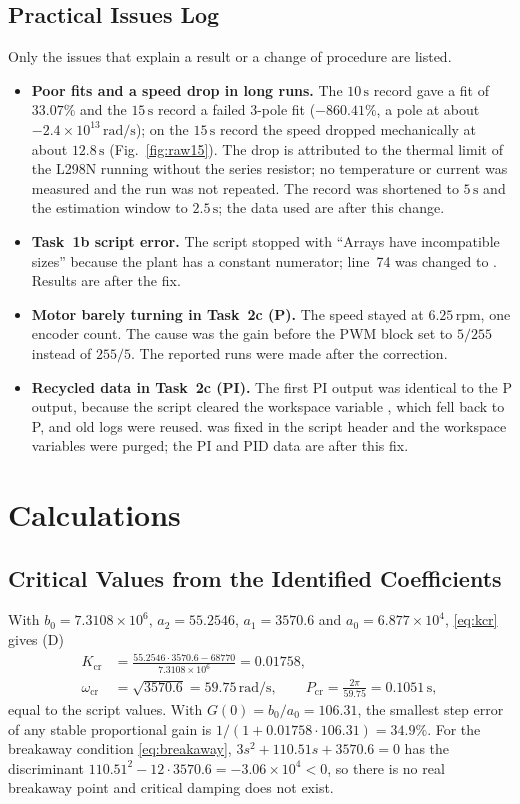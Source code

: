 \documentclass[lettersize,journal]{IEEEtran}
\newcommand{\code}[1]{\texttt{\detokenize{#1}}}
\newcommand{\Kcr}{K_{\mathrm{cr}}}
\newcommand{\wcr}{\omega_{\mathrm{cr}}}
\newcommand{\Pcr}{P_{\mathrm{cr}}}
\newcommand{\rpm}{\,\text{rpm}}
\begin{document}
\subsection{Practical Issues Log}
\label{sec:issues}
Only the issues that explain a result or a change of procedure are listed.
\begin{itemize}
\item \textbf{Poor fits and a speed drop in long runs.} The $10\,\text{s}$ record gave a fit of $33.07\%$ and the $15\,\text{s}$ record a failed $3$-pole fit ($-860.41\%$, a pole at about $-2.4\times10^{13}\,\text{rad/s}$); on the $15\,\text{s}$ record the speed dropped mechanically at about $12.8\,\text{s}$ (Fig.~\ref{fig:raw15}). The drop is attributed to the thermal limit of the L298N running without the series resistor; no temperature or current was measured and the run was not repeated. The record was shortened to $5\,\text{s}$ and the estimation window to $2.5\,\text{s}$; the data used are after this change.
\item \textbf{Task~1b script error.} The script stopped with ``Arrays have incompatible sizes'' because the plant has a constant numerator; line~74 was changed to \code{pn = polyder(den)}. Results are after the fix.
\item \textbf{Motor barely turning in Task~2c (P).} The speed stayed at $6.25\rpm$, one encoder count. The cause was the gain before the PWM block set to $5/255$ instead of $255/5$. The reported runs were made after the correction.
\item \textbf{Recycled data in Task~2c (PI).} The first PI output was identical to the P output, because the script cleared the workspace variable \code{MODE}, which fell back to P, and old logs were reused. \code{MODE} was fixed in the script header and the workspace variables were purged; the PI and PID data are after this fix.
\end{itemize}

\section{Calculations}

\subsection{Critical Values from the Identified Coefficients}
With $b_0=7.3108\times10^{6}$, $a_2=55.2546$, $a_1=3570.6$ and $a_0=6.877\times10^{4}$, \eqref{eq:kcr} gives (D)
\begin{align}
\Kcr&=\frac{55.2546\cdot3570.6-68770}{7.3108\times10^{6}}=0.01758,\\
\wcr&=\sqrt{3570.6}=59.75\,\text{rad/s},\qquad
\Pcr=\frac{2\pi}{59.75}=0.1051\,\text{s},
\end{align}
equal to the script values. With $G(0)=b_0/a_0=106.31$, the smallest step error of any stable proportional gain is $1/(1+0.01758\cdot106.31)=34.9\%$. For the breakaway condition \eqref{eq:breakaway}, $3s^2+110.51s+3570.6=0$ has the discriminant $110.51^2-12\cdot3570.6=-3.06\times10^{4}<0$, so there is no real breakaway point and critical damping does not exist.
\end{document}
